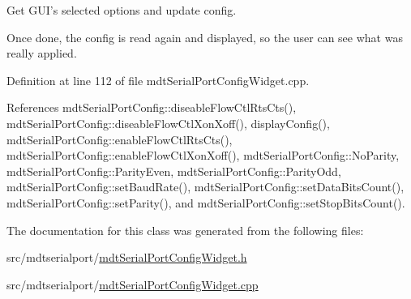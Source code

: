 Get G\-U\-I's selected options and update config. 

Once done, the config is read again and displayed, so the user can see what was really applied. 

Definition at line 112 of file mdt\-Serial\-Port\-Config\-Widget.\-cpp.



References mdt\-Serial\-Port\-Config\-::diseable\-Flow\-Ctl\-Rts\-Cts(), mdt\-Serial\-Port\-Config\-::diseable\-Flow\-Ctl\-Xon\-Xoff(), display\-Config(), mdt\-Serial\-Port\-Config\-::enable\-Flow\-Ctl\-Rts\-Cts(), mdt\-Serial\-Port\-Config\-::enable\-Flow\-Ctl\-Xon\-Xoff(), mdt\-Serial\-Port\-Config\-::\-No\-Parity, mdt\-Serial\-Port\-Config\-::\-Parity\-Even, mdt\-Serial\-Port\-Config\-::\-Parity\-Odd, mdt\-Serial\-Port\-Config\-::set\-Baud\-Rate(), mdt\-Serial\-Port\-Config\-::set\-Data\-Bits\-Count(), mdt\-Serial\-Port\-Config\-::set\-Parity(), and mdt\-Serial\-Port\-Config\-::set\-Stop\-Bits\-Count().



The documentation for this class was generated from the following files\-:\begin{DoxyCompactItemize}
\item 
src/mdtserialport/\hyperlink{mdt_serial_port_config_widget_8h}{mdt\-Serial\-Port\-Config\-Widget.\-h}\item 
src/mdtserialport/\hyperlink{mdt_serial_port_config_widget_8cpp}{mdt\-Serial\-Port\-Config\-Widget.\-cpp}\end{DoxyCompactItemize}
